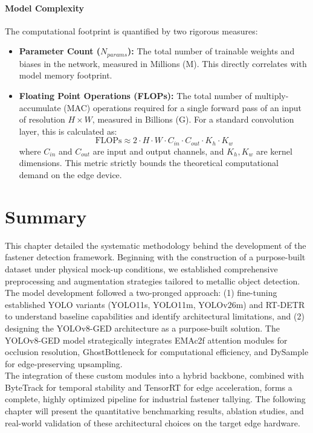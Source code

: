 \paragraph{Model Complexity}
The computational footprint is quantified by two rigorous measures:
\begin{itemize}
    \item \textbf{Parameter Count ($N_{params}$):} The total number of trainable weights and biases in the network, measured in Millions (M). This directly correlates with model memory footprint.
    \item \textbf{Floating Point Operations (FLOPs):} The total number of multiply-accumulate (MAC) operations required for a single forward pass of an input of resolution $H \times W$, measured in Billions (G). For a standard convolution layer, this is calculated as:
    \begin{equation}
        \text{FLOPs} \approx 2 \cdot H \cdot W \cdot C_{in} \cdot C_{out} \cdot K_h \cdot K_w
    \end{equation}
    where $C_{in}$ and $C_{out}$ are input and output channels, and $K_h, K_w$ are kernel dimensions. This metric strictly bounds the theoretical computational demand on the edge device.
\end{itemize}

\section{Summary}
\label{sec:chapter3_summary}

This chapter detailed the systematic methodology behind the development of the fastener detection framework. Beginning with the construction of a purpose-built dataset under physical mock-up conditions, we established comprehensive preprocessing and augmentation strategies tailored to metallic object detection.\\

The model development followed a two-pronged approach: (1) fine-tuning established YOLO variants (YOLO11s, YOLO11m, YOLOv26m) and RT-DETR to understand baseline capabilities and identify architectural limitations, and (2) designing the YOLOv8-GED architecture as a purpose-built solution. The YOLOv8-GED model strategically integrates EMAc2f attention modules for occlusion resolution, GhostBottleneck for computational efficiency, and DySample for edge-preserving upsampling.\\

The integration of these custom modules into a hybrid backbone, combined with ByteTrack for temporal stability and TensorRT for edge acceleration, forms a complete, highly optimized pipeline for industrial fastener tallying. The following chapter will present the quantitative benchmarking results, ablation studies, and real-world validation of these architectural choices on the target edge hardware.

